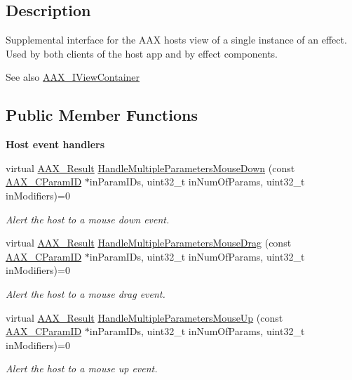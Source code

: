 \subsection{Description}
Supplemental interface for the A\+A\+X host\textquotesingle{}s view of a single instance of an effect. Used by both clients of the host app and by effect components. 

\begin{DoxySeeAlso}{See also}
\hyperlink{a00117}{A\+A\+X\+\_\+\+I\+View\+Container} 
\end{DoxySeeAlso}
\subsection*{Public Member Functions}
\begin{Indent}{\bf Host event handlers}\par
\begin{DoxyCompactItemize}
\item 
virtual \hyperlink{a00149_a4d8f69a697df7f70c3a8e9b8ee130d2f}{A\+A\+X\+\_\+\+Result} \hyperlink{a00085_a38ba1d1e161cac126d34adf5d5b5f288}{Handle\+Multiple\+Parameters\+Mouse\+Down} (const \hyperlink{a00149_a1440c756fe5cb158b78193b2fc1780d1}{A\+A\+X\+\_\+\+C\+Param\+I\+D} $\ast$in\+Param\+I\+Ds, uint32\+\_\+t in\+Num\+Of\+Params, uint32\+\_\+t in\+Modifiers)=0
\begin{DoxyCompactList}\small\item\em Alert the host to a mouse down event. \end{DoxyCompactList}\item 
virtual \hyperlink{a00149_a4d8f69a697df7f70c3a8e9b8ee130d2f}{A\+A\+X\+\_\+\+Result} \hyperlink{a00085_aab92e32e54f43a12e02e1449b1d5b664}{Handle\+Multiple\+Parameters\+Mouse\+Drag} (const \hyperlink{a00149_a1440c756fe5cb158b78193b2fc1780d1}{A\+A\+X\+\_\+\+C\+Param\+I\+D} $\ast$in\+Param\+I\+Ds, uint32\+\_\+t in\+Num\+Of\+Params, uint32\+\_\+t in\+Modifiers)=0
\begin{DoxyCompactList}\small\item\em Alert the host to a mouse drag event. \end{DoxyCompactList}\item 
virtual \hyperlink{a00149_a4d8f69a697df7f70c3a8e9b8ee130d2f}{A\+A\+X\+\_\+\+Result} \hyperlink{a00085_a60e8745816704fe309ce9fa9de9d7d79}{Handle\+Multiple\+Parameters\+Mouse\+Up} (const \hyperlink{a00149_a1440c756fe5cb158b78193b2fc1780d1}{A\+A\+X\+\_\+\+C\+Param\+I\+D} $\ast$in\+Param\+I\+Ds, uint32\+\_\+t in\+Num\+Of\+Params, uint32\+\_\+t in\+Modifiers)=0
\begin{DoxyCompactList}\small\item\em Alert the host to a mouse up event. \end{DoxyCompactList}\end{DoxyCompactItemize}
\end{Indent}


